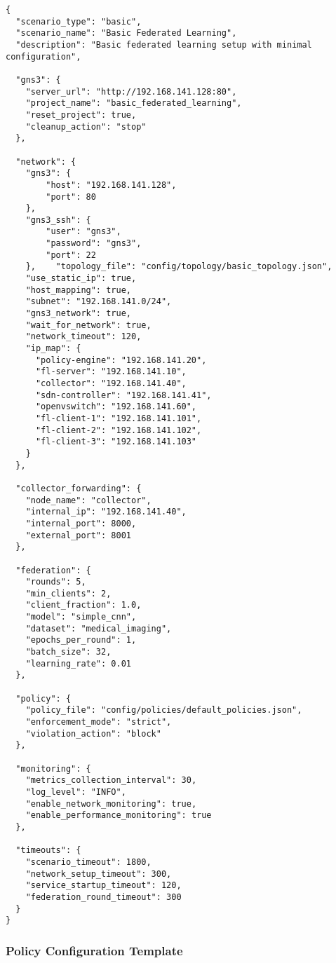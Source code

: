 \begin{lstlisting}[style=jsoncode, caption=Scenario Configuration Template]
{
  "scenario_type": "basic",
  "scenario_name": "Basic Federated Learning",
  "description": "Basic federated learning setup with minimal configuration",
  
  "gns3": {
    "server_url": "http://192.168.141.128:80",
    "project_name": "basic_federated_learning",
    "reset_project": true,
    "cleanup_action": "stop"
  },
  
  "network": {
    "gns3": {
        "host": "192.168.141.128", 
        "port": 80 
    },
    "gns3_ssh": { 
        "user": "gns3", 
        "password": "gns3", 
        "port": 22 
    },    "topology_file": "config/topology/basic_topology.json",
    "use_static_ip": true,
    "host_mapping": true,
    "subnet": "192.168.141.0/24",
    "gns3_network": true,
    "wait_for_network": true,
    "network_timeout": 120,
    "ip_map": {
      "policy-engine": "192.168.141.20",
      "fl-server": "192.168.141.10",
      "collector": "192.168.141.40",
      "sdn-controller": "192.168.141.41",
      "openvswitch": "192.168.141.60",
      "fl-client-1": "192.168.141.101",
      "fl-client-2": "192.168.141.102",
      "fl-client-3": "192.168.141.103"
    }
  },

  "collector_forwarding": {
    "node_name": "collector",
    "internal_ip": "192.168.141.40",
    "internal_port": 8000, 
    "external_port": 8001  
  },
  
  "federation": {
    "rounds": 5,
    "min_clients": 2,
    "client_fraction": 1.0,
    "model": "simple_cnn",
    "dataset": "medical_imaging",
    "epochs_per_round": 1,
    "batch_size": 32,
    "learning_rate": 0.01
  },
  
  "policy": {
    "policy_file": "config/policies/default_policies.json",
    "enforcement_mode": "strict",
    "violation_action": "block"
  },
  
  "monitoring": {
    "metrics_collection_interval": 30,
    "log_level": "INFO",
    "enable_network_monitoring": true,
    "enable_performance_monitoring": true
  },
  
  "timeouts": {
    "scenario_timeout": 1800,
    "network_setup_timeout": 300,
    "service_startup_timeout": 120,
    "federation_round_timeout": 300
  }
}
\end{lstlisting}

\subsubsection{Policy Configuration Template}


